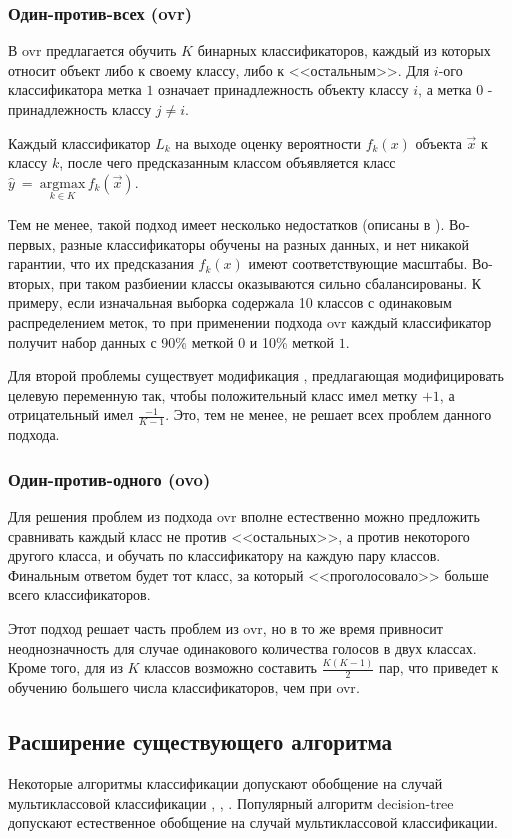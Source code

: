 \subsubsection{Один-против-всех (\acrshort{ovr})}
В \acrshort{ovr} предлагается обучить $K$ бинарных классификаторов, каждый из которых относит объект либо к своему классу, либо к <<остальным>>.
Для $i$-ого классификатора метка $1$ означает принадлежность объекту классу $i$, а метка $0$ - принадлежность классу $j \neq i$.

Каждый классификатор $L_k$ на выходе оценку вероятности $f_k (x)$ объекта $\vec{x}$ к классу $k$, после чего предсказанным классом объявляется класс $\hat{y}~=~\underset{k \in K}{\mathrm{argmax}}\, f_k (\vec{x})$.

Тем не менее, такой подход имеет несколько недостатков (описаны в \cite{bishop}).
Во-первых, разные классификаторы обучены на разных данных, и нет никакой гарантии, что их предсказания $f_k (x)$ имеют соответствующие масштабы.
Во-вторых, при таком разбиении классы оказываются сильно сбалансированы.
К примеру, если изначальная выборка содержала 10 классов с одинаковым распределением меток, то при применении подхода \acrshort{ovr} каждый классификатор получит набор данных с 90\% меткой $0$ и 10\% меткой $1$.

Для второй проблемы существует модификация \cite{lee_N-1}, предлагающая модифицировать целевую переменную так, чтобы положительный класс имел метку $+1$, а отрицательный имел $\frac{-1}{K-1}$.
Это, тем не менее, не решает всех проблем данного подхода.
\subsubsection{Один-против-одного (\acrshort{ovo})}
Для решения проблем из подхода \acrshort{ovr} вполне естественно можно предложить сравнивать каждый класс не против <<остальных>>, а против некоторого другого класса, и обучать по классификатору на каждую пару классов.
Финальным ответом будет тот класс, за который <<проголосовало>> больше всего классификаторов.

Этот подход решает часть проблем из \acrshort{ovr}, но в то же время привносит неоднозначность для случае одинакового количества голосов в двух классах.
Кроме того, для из $K$ классов возможно составить $\frac{K (K - 1)}{2}$ пар, что приведет к обучению большего числа классификаторов, чем при \acrshort{ovr}.
\subsection{Расширение существующего алгоритма}
Некоторые алгоритмы классификации допускают обобщение на случай мультиклассовой классификации \cite{binclass-generalization-1}, \cite{binclass-generalization-2}, \cite{binclass-generalization-3}.
Популярный алгоритм \gls{decision-tree} допускают естественное обобщение на случай мультиклассовой классификации.
